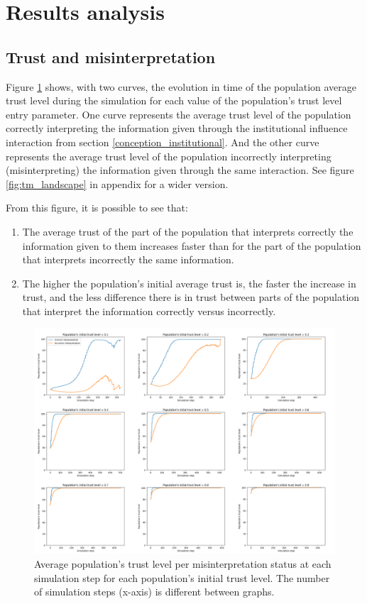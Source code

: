 \section{Results analysis}
\label{results_analysis}

\subsection{Trust and misinterpretation}

Figure \ref{fig:tm} shows, with two curves, the evolution in time of the population average trust level during the simulation for each value of the population's trust level entry parameter. One curve represents the average trust level of the population correctly interpreting the information given through the institutional influence interaction from section \ref{conception_institutional}. And the other curve represents the average trust level of the population incorrectly interpreting (misinterpreting) the information given through the same interaction. See figure \ref{fig:tm_landscape} in appendix for a wider version.

From this figure, it is possible to see that:
\begin{enumerate}
    \item The average trust of the part of the population that interprets correctly the information given to them increases faster than for the part of the population that interprets incorrectly the same information.
    \item The higher the population's initial average trust is, the faster the increase in trust, and the less difference there is in trust between parts of the population that interpret the information correctly versus incorrectly.
\end{enumerate}

\begin{figure}[!htb]
    \centering
        \includegraphics[width=\linewidth]{pics/TM.png}
    \endminipage{}
    \caption{Average population's trust level per misinterpretation status at each simulation step for each population's initial trust level. The number of simulation steps (x-axis) is different between graphs.}
    \label{fig:tm}
\end{figure}

